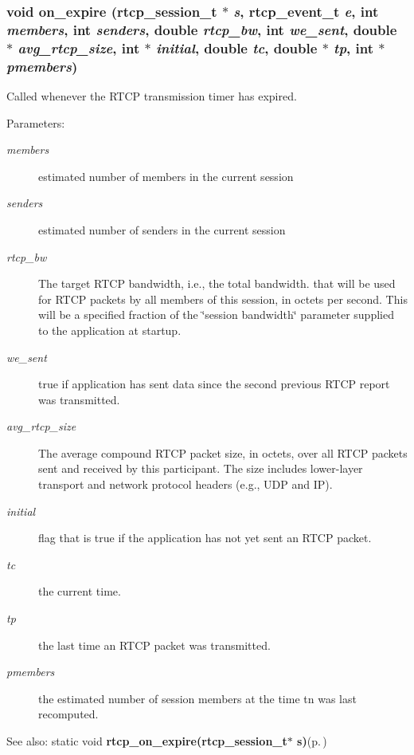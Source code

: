 \subsubsection{\setlength{\rightskip}{0pt plus 5cm}void on\_\-expire ({\bf rtcp\_\-session\_\-t} $\ast$ {\em s}, {\bf rtcp\_\-event\_\-t} {\em e}, int {\em members}, int {\em senders}, double {\em rtcp\_\-bw}, int {\em we\_\-sent}, double $\ast$ {\em avg\_\-rtcp\_\-size}, int $\ast$ {\em initial}, double {\em tc}, double $\ast$ {\em tp}, int $\ast$ {\em pmembers})\hspace{0.3cm}{\tt  [static]}}\label{rtcp_8c_a16}


Called whenever the RTCP transmission timer has expired. \begin{Desc}
\item[Parameters:]
\begin{description}
\item[{\em members}]estimated number of members in the current session \item[{\em senders}]estimated number of senders in the current session \item[{\em rtcp\_\-bw}]The target RTCP bandwidth, i.e., the total bandwidth. that will be used for RTCP packets by all members of this session, in octets per second. This will be a specified fraction of the \char`\"{}session bandwidth\char`\"{} parameter supplied to the application at startup. \item[{\em we\_\-sent}]true if application has sent data since the second previous RTCP report was transmitted. \item[{\em avg\_\-rtcp\_\-size}]The average compound RTCP packet size, in octets, over all RTCP packets sent and received by this participant. The size includes lower-layer transport and network protocol headers (e.g., UDP and IP). \item[{\em initial}]flag that is true if the application has not yet sent an RTCP packet. \item[{\em tc}]the current time. \item[{\em tp}]the last time an RTCP packet was transmitted. \item[{\em pmembers}]the estimated number of session members at the time tn was last recomputed. \end{description}
\end{Desc}
\begin{Desc}
\item[See also:]static void {\bf rtcp\_\-on\_\-expire(rtcp\_\-session\_\-t$\ast$ s)}{\rm (p.\,\pageref{rtcp_8h_a14})} \end{Desc}
